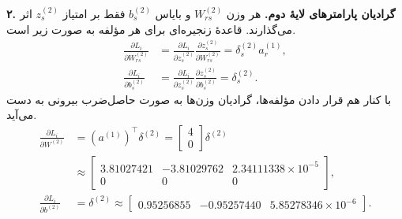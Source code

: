 \documentclass{article}
\numberwithin{equation}{section}
\numberwithin{table}{section}
\begin{document}
\noindent\textbf{۲. گرادیان پارامترهای لایهٔ دوم.}
هر وزن \(W_{rs}^{(2)}\) و بایاس \(b_s^{(2)}\) فقط بر امتیاز \(z_s^{(2)}\) اثر می‌گذارند. قاعدهٔ زنجیره‌ای برای هر مؤلفه به صورت زیر است.
\begin{align*}
    \frac{\partial L_i}{\partial W_{rs}^{(2)}}
    &=\frac{\partial L_i}{\partial z_s^{(2)}}
      \frac{\partial z_s^{(2)}}{\partial W_{rs}^{(2)}}
      =\delta_s^{(2)}a_r^{(1)},\\
    \frac{\partial L_i}{\partial b_s^{(2)}}
    &=\frac{\partial L_i}{\partial z_s^{(2)}}
      \frac{\partial z_s^{(2)}}{\partial b_s^{(2)}}
      =\delta_s^{(2)}.
\end{align*}
با کنار هم قرار دادن مؤلفه‌ها، گرادیان وزن‌ها به صورت حاصل‌ضرب بیرونی به دست می‌آید.
\begin{align*}
    \frac{\partial L_i}{\partial W^{(2)}}
    &=(a^{(1)})^\top\delta^{(2)}
      =\begin{bmatrix}4\\0\end{bmatrix}\delta^{(2)}\\
    &\approx\begin{bmatrix}3.81027421&-3.81029762&2.34111338\times10^{-5}\\0&0&0\end{bmatrix},\\
    \frac{\partial L_i}{\partial b^{(2)}}
    &=\delta^{(2)}
      \approx\begin{bmatrix}0.95256855&-0.95257440&5.85278346\times10^{-6}\end{bmatrix}.
\end{align*}
\end{document}
